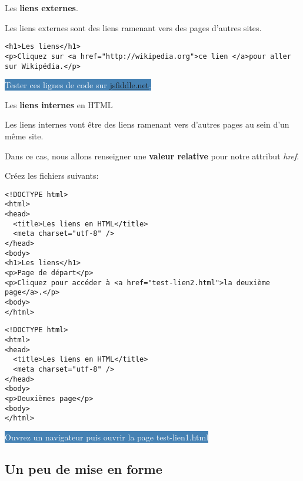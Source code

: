 \documentclass[10pt,dvipsnames, dvips, svgnames]{article}
\begin{document}
\begin{list}{}{}
\item Les \textbf{liens externes}.

Les liens externes sont des liens ramenant vers des pages d'autres sites.


\begin{lstlisting}
<h1>Les liens</h1>
<p>Cliquez sur <a href="http://wikipedia.org">ce lien </a>pour aller sur Wikipédia.</p>
\end{lstlisting}


\hypersetup{urlcolor=white}
\colorbox{SteelBlue}{\textcolor{white}{Tester ces lignes de code sur \href{https://jsfiddle.net/}{jsfiddle.net}.}}
\hypersetup{urlcolor=blue}

\item Les \textbf{liens internes} en HTML

Les liens internes vont être des liens ramenant vers d'autres pages au sein d'un même site.

Dans ce cas, nous allons renseigner une \textbf{valeur relative} pour notre attribut \textit{href}.

Créez les fichiers suivants:

\begin{lstlisting}
<!DOCTYPE html>
<html>
<head>
  <title>Les liens en HTML</title>
  <meta charset="utf-8" />
</head>
<body>
<h1>Les liens</h1>
<p>Page de départ</p>
<p>Cliquez pour accéder à <a href="test-lien2.html">la deuxième page</a>.</p>
<body>
</html>
\end{lstlisting}

\begin{lstlisting}
<!DOCTYPE html>
<html>
<head>
  <title>Les liens en HTML</title>
  <meta charset="utf-8" />
</head>
<body>
<p>Deuxièmes page</p>
<body>
</html>
\end{lstlisting}

\hypersetup{urlcolor=white}
\colorbox{SteelBlue}{\textcolor{white}{Ouvrez un navigateur puis ouvrir la page test-lien1.html}}
\hypersetup{urlcolor=blue}

\end{list}


\subsection{Un peu de mise en forme}
\end{document}
